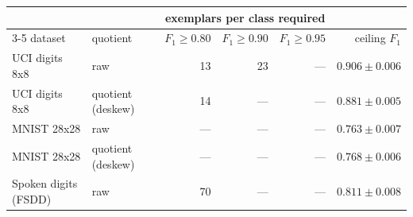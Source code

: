 \begin{tabular}{llrrrr}
\toprule
& & \multicolumn{3}{c}{exemplars per class required} & \\
\cmidrule(lr){3-5}
dataset & quotient & $F_1\!\ge\!0.80$ & $F_1\!\ge\!0.90$ & $F_1\!\ge\!0.95$ & ceiling $F_1$ \\
\midrule
UCI digits 8x8 & raw & 13 & 23 & --- & $0.906 \pm 0.006$ \\
UCI digits 8x8 & quotient (deskew) & 14 & --- & --- & $0.881 \pm 0.005$ \\
MNIST 28x28 & raw & --- & --- & --- & $0.763 \pm 0.007$ \\
MNIST 28x28 & quotient (deskew) & --- & --- & --- & $0.768 \pm 0.006$ \\
Spoken digits (FSDD) & raw & 70 & --- & --- & $0.811 \pm 0.008$ \\
\bottomrule
\end{tabular}
